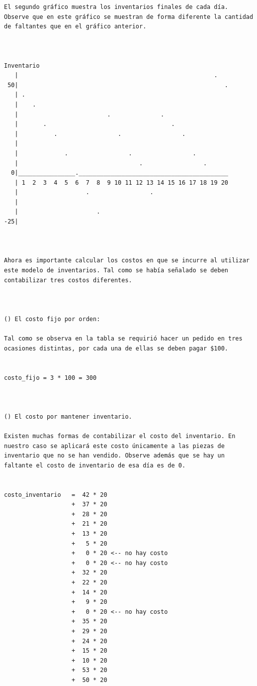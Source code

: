 \begin{verbatim}
El segundo gráfico muestra los inventarios finales de cada día. Observe que en este gráfico se muestran de forma diferente la cantidad de faltantes que en el gráfico anterior.



Inventario
   |                                                       .
 50|                                                          .
   | .
   |    .
   |                         .              .
   |       .                                   .
   |          .                 .                 .
   |
   |             .                 .                 .
   |                                  .                 .
  0|________________.__________________________________________
   | 1  2  3  4  5  6  7  8  9 10 11 12 13 14 15 16 17 18 19 20
   |                   .                 .
   |
   |                      .
-25|



Ahora es importante calcular los costos en que se incurre al utilizar este modelo de inventarios. Tal como se había señalado se deben contabilizar tres costos diferentes.



() El costo fijo por orden:

Tal como se observa en la tabla se requirió hacer un pedido en tres ocasiones distintas, por cada una de ellas se deben pagar $100.


costo_fijo = 3 * 100 = 300



() El costo por mantener inventario.

Existen muchas formas de contabilizar el costo del inventario. En nuestro caso se aplicará este costo únicamente a las piezas de inventario que no se han vendido. Observe además que se hay un faltante el costo de inventario de esa día es de 0.


costo_inventario   =  42 * 20
                   +  37 * 20
                   +  28 * 20
                   +  21 * 20
                   +  13 * 20
                   +   5 * 20
                   +   0 * 20 <-- no hay costo
                   +   0 * 20 <-- no hay costo
                   +  32 * 20
                   +  22 * 20
                   +  14 * 20
                   +   9 * 20
                   +   0 * 20 <-- no hay costo
                   +  35 * 20
                   +  29 * 20
                   +  24 * 20
                   +  15 * 20
                   +  10 * 20
                   +  53 * 20
                   +  50 * 20



\end{verbatim}
